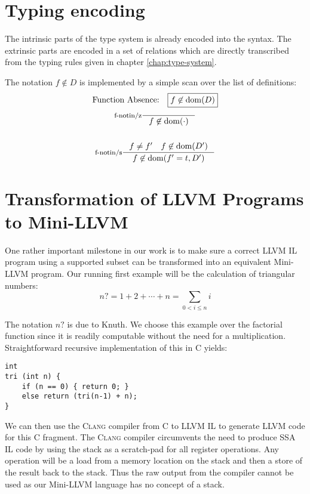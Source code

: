 \documentclass[a4paper, oneside, 10pt, final]{memoir}
\newcommand{\clang}{\textsc{Clang}}
\begin{document}
\section{Typing encoding}

The intrinsic parts of the type system is already encoded into the
syntax. The extrinsic parts are encoded in a set of relations which are
directly transcribed from the typing rules given in chapter
\ref{chap:type-system}.

The notation $f \not \in D$ is implemented by a simple scan over the
list of definitions:
\begin{gather*}
  \text{Function Absence:} \quad \boxed{f \not \in \dom{D}}\\
  \inference[f-notin/z]{}{f \not \in \dom{\cdot}}\\\\
  \inference[f-notin/s]{f \neq f' \quad f \not \in \dom{D'}}{f \not \in \dom{f' = t, D'}}
\end{gather*}
\section{Transformation of LLVM Programs to Mini-LLVM}

One rather important milestone in our work is to make sure a correct
LLVM IL program using a supported subset can be transformed into an
equivalent Mini-LLVM program. Our running first example will be the
calculation of triangular numbers:
\begin{equation}
  \label{eq:1}
  n? = 1 + 2 + \dotsb + n = \sum_{0 < i \leq n} i
\end{equation}

The notation $n?$ is due to Knuth\cite[section
1.2.5]{knuth:1997:taocp1}. We choose this example over the factorial
function since it is readily computable without the need for a
multiplication. Straightforward recursive implementation of
this in C yields:
\begin{verbatim}
int
tri (int n) {
    if (n == 0) { return 0; }
    else return (tri(n-1) + n);
}
\end{verbatim}
We can then use the \clang{} compiler from C to LLVM IL to generate
LLVM code for this C fragment. The \clang{} compiler circumvents the
need to produce SSA IL code by using the stack as a scratch-pad for
all register operations. Any operation will be a load from a memory
location on the stack and then a store of the result back to the
stack. Thus the raw output from the compiler cannot be used as our
Mini-LLVM language has no concept of a stack.
\end{document}
